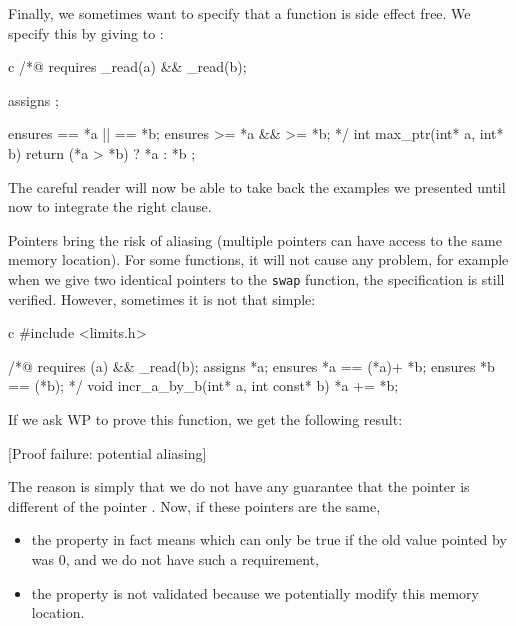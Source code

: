 \documentclass[middle]{zmdocument}
\begin{document}
Finally, we sometimes want to specify that a function is side effect
free. We specify this by giving  to
:



\begin{CodeBlock}{c}
/*@
  requires \valid_read(a) && \valid_read(b);

  assigns  \nothing;

  ensures \result == *a || \result == *b;
  ensures \result >= *a && \result >= *b;
*/
int max_ptr(int* a, int* b){
  return (*a > *b) ? *a : *b ;
}
\end{CodeBlock}



The careful reader will now be able to take back the examples we
presented until now to integrate the right  clause.





Pointers bring the risk of aliasing (multiple pointers can have access
to the same memory location). For some functions, it will not cause any
problem, for example when we give two identical pointers to the
\texttt{swap} function, the specification is still verified. However,
sometimes it is not that simple:



\begin{CodeBlock}{c}
#include <limits.h>

/*@
  requires \valid(a) && \valid_read(b);
  assigns  *a;
  ensures  *a == \old(*a)+ *b;
  ensures  *b == \old(*b);
*/
void incr_a_by_b(int* a, int const* b){
  *a += *b;
}
\end{CodeBlock}



If we ask WP to prove this function, we get the following result:



[Proof failure: potential aliasing]


The reason is simply that we do not have any guarantee that the pointer
 is different of the pointer . Now, if these
pointers are the same,



\begin{itemize}
\item   the property  in fact
  means  which can only
  be true if the old value pointed by  was $0$, and we do
  not have such a requirement,
\item
  the property  is not validated
  because we potentially modify this memory location.
\end{itemize}
\end{document}
